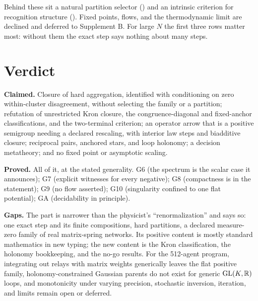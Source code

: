 Behind these sit a natural partition selector () and an intrinsic criterion for
recognition structure (). Fixed points, flows, and the thermodynamic limit are
declined and deferred to Supplement B. For large \(N\) the first three rows matter most: without them the exact step
says nothing about many steps.

\section{Verdict}
\label{comp:sg2-verdict}

\begin{verdictbox}{\DELIVERED}
\textbf{Claimed.} Closure of hard aggregation, identified with conditioning on zero within-cluster disagreement,
without selecting the family or a partition; refutation of unrestricted Kron closure, the congruence-diagonal and
fixed-anchor classifications, and the two-terminal criterion; an operator arrow that is a positive semigroup needing a
declared rescaling, with interior law steps and biadditive closure; reciprocal pairs, anchored stars, and loop
holonomy; a decision metatheory; and no fixed point or asymptotic scaling.

\textbf{Proved.} All of it, at the stated generality. G6 \DELIVERED{} (the spectrum is the scalar case it announces);
G7 \DELIVERED{} (explicit witnesses for every negative); G8 \DELIVERED{} (compactness is in the statement); G9
\DELIVERED{} (no flow asserted); G10 \DELIVERED{} (singularity confined to one flat potential); GA \DELIVERED{}
(decidability in principle).

\textbf{Gaps.} The part is narrower than the physicist's ``renormalization'' and says so: one exact step and its finite
compositions, hard partitions, a declared measure-zero family of real matrix-spring networks. Its positive content is
mostly standard mathematics in new typing; the new content is the Kron classification, the holonomy bookkeeping, and
the no-go results. For the 512-agent program, integrating out relays with matrix weights generically leaves the flat
positive family, holonomy-constrained Gaussian parents do not exist for generic \(\mathrm{GL}(K,\mathbb R)\) loops, and monotonicity
under varying precision, stochastic inversion, iteration, and limits remain open or deferred.
\end{verdictbox}
